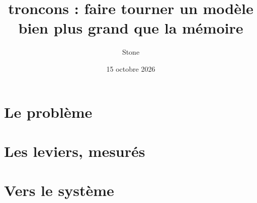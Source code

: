 \documentclass[11pt, a4paper, twoside, openright, parskip=false, headings=big,
               chapterprefix=true, numbers=noenddot, bibliography=totoc,
               listof=totoc]{scrbook}
\title{troncons : faire tourner un modèle bien plus grand que la mémoire}
\author{Stone}
\date{15 octobre 2026}
\begin{document}
\frontmatter


\tableofcontents
\listoffigures
\listoftables
\lstlistoflistings


\mainmatter
\part{Le problème}





\part{Les leviers, mesurés}






\part{Vers le système}




\appendix




\backmatter
\printbibliography[heading=bibintoc, title={Bibliographie}]
\end{document}
